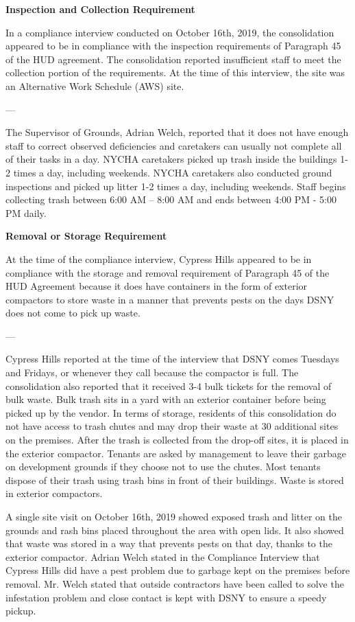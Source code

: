 
\textbf{Inspection and Collection Requirement}

In a compliance interview conducted on October 16th, 2019, the consolidation appeared to be in compliance with the inspection requirements of Paragraph 45 of the HUD agreement. The consolidation reported insufficient staff to meet the collection portion of the requirements. At the time of this interview, the site was an Alternative Work Schedule (AWS) site. 

---

The Supervisor of Grounds, Adrian Welch, reported that it does not have enough staff to correct observed deficiencies and caretakers can usually not complete all of their tasks in a day. NYCHA caretakers picked up trash inside the buildings 1-2 times a day, including weekends. NYCHA caretakers also conducted ground inspections and picked up litter 1-2 times a day, including weekends. Staff begins collecting trash between 6:00 AM -- 8:00 AM and ends between 4:00 PM - 5:00 PM daily. 

\textbf{Removal or Storage Requirement}

At the time of the compliance interview, Cypress Hills appeared to be in compliance with the storage and removal requirement of Paragraph 45 of the HUD Agreement because it does have containers in the form of exterior compactors to store waste in a manner that prevents pests on the days DSNY does not come to pick up waste.

---

Cypress Hills reported at the time of the interview that DSNY comes Tuesdays and Fridays, or whenever they call because the compactor is full. The consolidation also reported that it received 3-4 bulk tickets for the removal of bulk waste. Bulk trash sits in a yard with an exterior container before being picked up by the vendor. In terms of storage, residents of this consolidation do not have access to trash chutes and may drop their waste at 30 additional sites on the premises. After the trash is collected from the drop-off sites, it is placed in the exterior compactor. Tenants are asked by management to leave their garbage on development grounds if they choose not to use the chutes. Most tenants dispose of their trash using trash bins in front of their buildings. Waste is stored in exterior compactors. 

A single site visit on October 16th, 2019 showed exposed trash and litter on the grounds and rash bins placed throughout the area with open lids. It also showed that waste was stored in a way that prevents pests on that day, thanks to the exterior compactor. Adrian Welch stated in the Compliance Interview that Cypress Hills did have a pest problem due to garbage kept on the premises before removal. Mr. Welch stated that outside contractors have been called to solve the infestation problem and close contact is kept with DSNY to ensure a speedy pickup.

